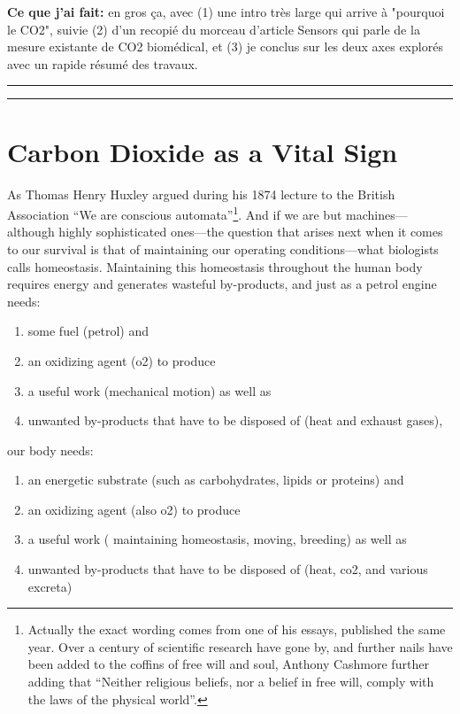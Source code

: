 \textbf{Ce que j'ai fait:} en gros ça, avec (1) une intro très large qui arrive à "pourquoi le CO2", suivie (2) d'un recopié du morceau d'article Sensors qui parle de la mesure existante de CO2 biomédical, et (3) je conclus sur les deux axes explorés avec un rapide résumé des travaux.

\vspace{.3cm}\hrule\vspace{.1cm}\hrule\vspace{.3cm}

\section{Carbon Dioxide as a Vital Sign}

As Thomas Henry Huxley argued during his 1874 lecture to the British Association\cite{huxley1874_nat} \enquote{We are conscious automata}\footnote{Actually the exact wording comes from one of his essays, published the same year\cite{huxley1874}. Over a century of scientific research have gone by, and further nails have been added to the coffins of free will and soul, Anthony Cashmore further adding that \enquote{Neither religious beliefs, nor a belief in free will, comply with the laws of the physical world}\cite{cashmore2010}.}. And if we are but machines---although highly sophisticated ones---the question that arises next when it comes to our survival is that of maintaining our operating conditions---what biologists calls homeostasis. Maintaining this homeostasis throughout the human body requires energy and generates wasteful by-products, and just as a petrol engine needs:
\begin{enumerate}
	\item some fuel (petrol) and
	\item an oxidizing agent (\gls{o2}) to produce
	\item a useful work (mechanical motion) as well as
	\item unwanted by-products that have to be disposed of (heat and exhaust gases),
\end{enumerate} 
our body needs:
\begin{enumerate}
	\item an energetic substrate (such as carbohydrates, lipids or proteins) and
	\item an oxidizing agent (also \gls{o2}) to produce
	\item a useful work (\eg{} maintaining homeostasis, moving, breeding) as well as
	\item unwanted by-products that have to be disposed of (heat, \gls{co2}, and various excreta)
\end{enumerate}

